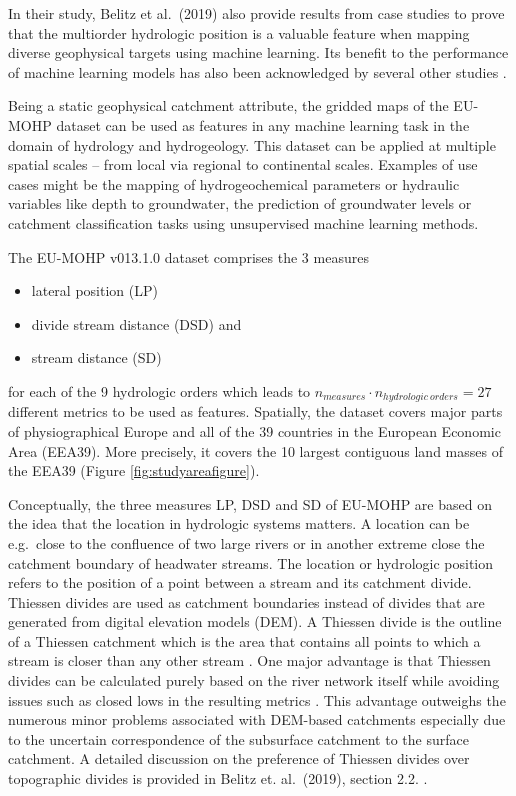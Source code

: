 \documentclass[fleqn,10pt]{wlscirep}
\providecommand{\tightlist}{%
  \setlength{\itemsep}{0pt}\setlength{\parskip}{0pt}}
\begin{document}
In their study, Belitz et al.~(2019)\cite{belitz_multiorder_2019} also provide results from case studies to prove that the multiorder hydrologic position is a valuable feature when mapping diverse geophysical targets using machine learning. Its benefit to the performance of machine learning models has also been acknowledged by several other studies \cite{degnan_relation_2020, knierim_using_2020, stackelberg_machine_2021}.

Being a static geophysical catchment attribute, the gridded maps of the EU-MOHP dataset\cite{nolscher_eu-mohp_2021-1} can be used as features in any machine learning task in the domain of hydrology and hydrogeology. This dataset can be applied at multiple spatial scales -- from local via regional to continental scales. Examples of use cases might be the mapping of hydrogeochemical parameters or hydraulic variables like depth to groundwater, the prediction of groundwater levels or catchment classification tasks using unsupervised machine learning methods.

The EU-MOHP v013.1.0 dataset\cite{nolscher_eu-mohp_2021-1} comprises the 3 measures

\begin{itemize}
\tightlist
\item
  lateral position (LP)
\item
  divide stream distance (DSD) and
\item
  stream distance (SD)
\end{itemize}

\noindent 
for each of the 9 hydrologic orders which leads to \(n_{measures}\cdot n_{hydrologic\: orders} = 27\) different metrics to be used as features. Spatially, the dataset covers major parts of physiographical Europe and all of the 39 countries in the European Economic Area (EEA39). More precisely, it covers the 10 largest contiguous land masses of the EEA39 (Figure \ref{fig:studyareafigure}).

Conceptually, the three measures LP, DSD and SD of EU-MOHP\cite{nolscher_eu-mohp_2021-1} are based on the idea that the location in hydrologic systems matters\cite{belitz_multiorder_2019}. A location can be e.g.~close to the confluence of two large rivers or in another extreme close the catchment boundary of headwater streams. The location or hydrologic position refers to the position of a point between a stream and its catchment divide. Thiessen divides are used as catchment boundaries instead of divides that are generated from digital elevation models (DEM). A Thiessen divide is the outline of a Thiessen catchment which is the area that contains all points to which a stream is closer than any other stream \cite{johnston_evaluation_2009}. One major advantage is that Thiessen divides can be calculated purely based on the river network itself while avoiding issues such as closed lows in the resulting metrics \cite{belitz_multiorder_2019}. This advantage outweighs the numerous minor problems associated with DEM-based catchments especially due to the uncertain correspondence of the subsurface catchment to the surface catchment. A detailed discussion on the preference of Thiessen divides over topographic divides is provided in Belitz et. al.~(2019), section 2.2. \cite{belitz_multiorder_2019}.
\end{document}
